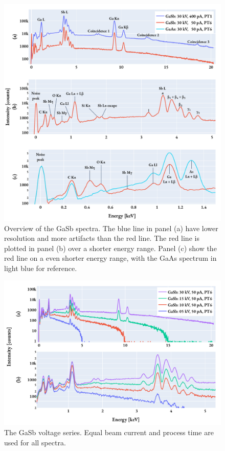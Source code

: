 \begin{figure}[hbtp]
    \centering
    \includegraphics[width=0.99\linewidth]{figures/results/spectrum_overviews.pdf}
    \caption{
        Overview of the GaSb spectra.
        The blue line in panel (a) have lower resolution and more artifacts than the red line.
        The red line is plotted in panel (b) over a shorter energy range.
        Panel (c) show the red line on a even shorter energy range, with the GaAs spectrum in light blue for reference.
    }
    \label{fig:results:overviewGaSb_withArtifacts}
\end{figure}


\begin{figure}[hbtp]
    \centering
    \includegraphics[width=0.90\linewidth]{figures/results/GaSb_voltages.pdf}
    \caption{
        The GaSb voltage series.
        Equal beam current and process time are used for all spectra.
    }
    \label{fig:results:GaSb_voltages}
\end{figure}


